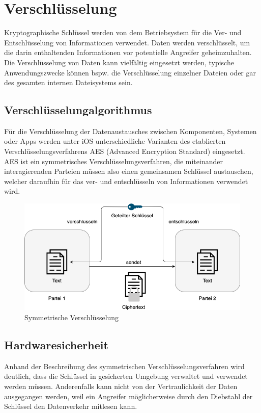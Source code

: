 \section{Verschlüsselung}
Kryptographische Schlüssel werden von dem Betriebsystem für die Ver- und Entschlüsselung von 
Informationen verwendet. Daten werden verschlüsselt, um die darin enthaltenden Informationen 
vor potentielle Angreifer geheimzuhalten. Die Verschlüsselung von Daten kann vielfältig eingesetzt 
werden, typische Anwendungszwecke können bspw. die Verschlüsselung einzelner Dateien oder gar 
des gesamten internen Dateisystems sein. \cite{symmetricenc}


\subsection{Verschlüsselungalgorithmus}
Für die Verschlüsselung der Datenaustausches zwischen Komponenten, Systemen oder Apps
werden unter iOS unterschiedliche Varianten des etablierten Verschlüsselungsverfahrens
AES (Advanced Encryption Standard) eingesetzt. AES ist ein symmetrisches Verschlüsselungsverfahren,
die miteinander interagierenden Parteien müssen also einen gemeinsamen Schlüssel austauschen, welcher
daraufhin für das ver- und entschlüsseln von Informationen verwendet wird. \cite{symmetricenc} \cite{apple2020} \\

	\begin{figure}[h]
		\centering
		\includegraphics[width=135mm]{images/symmetric.png}
		\caption{Symmetrische Verschlüsselung \cite{symmetricenc}}
		\label{fig:symmetric}
	\end{figure}

\pagebreak

\subsection{Hardwaresicherheit}
Anhand der Beschreibung des symmetrischen Verschlüsselungsverfahren wird deutlich, dass die Schlüssel in
gesicherten Umgebung verwaltet und verwendet werden müssen. Anderenfalls kann nicht von der Vertraulichkeit 
der Daten ausgegangen werden, weil ein Angreifer möglicherweise durch den Diebstahl der Schlüssel den Datenverkehr
mitlesen kann. \cite{apple2020} \\

